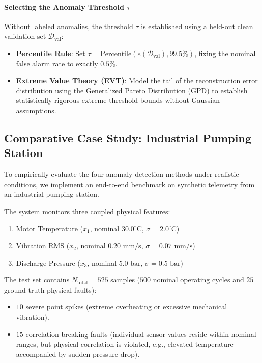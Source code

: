 \paragraph{Selecting the Anomaly Threshold $\tau$}
Without labeled anomalies, the threshold $\tau$ is established using a held-out clean validation set $\mathcal{D}_{\text{val}}$:
\begin{itemize}
    \item \textbf{Percentile Rule}: Set $\tau = \text{Percentile}(e(\mathcal{D}_{\text{val}}), 99.5\%)$, fixing the nominal false alarm rate to exactly $0.5\%$.
    \item \textbf{Extreme Value Theory (EVT)}: Model the tail of the reconstruction error distribution using the Generalized Pareto Distribution (GPD) to establish statistically rigorous extreme threshold bounds without Gaussian assumptions.
\end{itemize}

\subsection{Comparative Case Study: Industrial Pumping Station}\label{subsec:comparative_case_study}

To empirically evaluate the four anomaly detection methods under realistic conditions, we implement an end-to-end benchmark on synthetic telemetry from an industrial pumping station.

The system monitors three coupled physical features:
\begin{enumerate}
    \item Motor Temperature ($x_1$, nominal $30.0^\circ\text{C}$, $\sigma = 2.0^\circ\text{C}$)
    \item Vibration RMS ($x_2$, nominal $0.20\text{ mm/s}$, $\sigma = 0.07\text{ mm/s}$)
    \item Discharge Pressure ($x_3$, nominal $5.0\text{ bar}$, $\sigma = 0.5\text{ bar}$)
\end{enumerate}

The test set contains $N_{\text{total}} = 525$ samples ($500$ nominal operating cycles and $25$ ground-truth physical faults):
\begin{itemize}
    \item $10$ severe point spikes (extreme overheating or excessive mechanical vibration).
    \item $15$ correlation-breaking faults (individual sensor values reside within nominal ranges, but physical correlation is violated, e.g., elevated temperature accompanied by sudden pressure drop).
\end{itemize}

